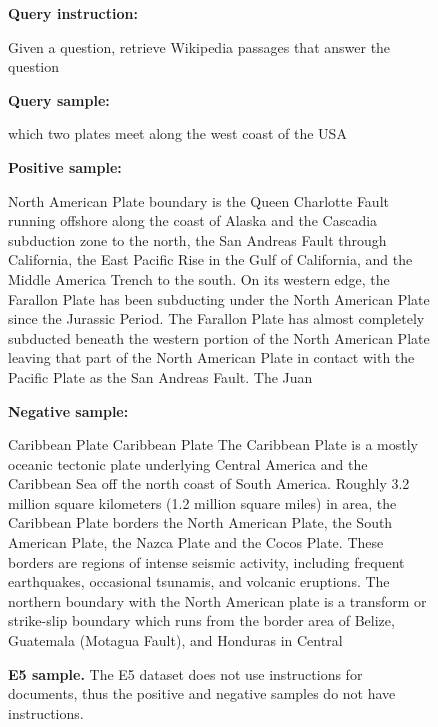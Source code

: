 \documentclass{article}
\begin{document}
\begin{figure}[htbp]
\hrulefill

\textbf{Query instruction:}

\hrulefill

Given a question, retrieve Wikipedia passages that answer the question

\hrulefill

\textbf{Query sample:}

\hrulefill

which two plates meet along the west coast of the USA

\hrulefill

\textbf{Positive sample:}

\hrulefill

North American Plate boundary is the Queen Charlotte Fault running offshore along the coast of Alaska and the Cascadia subduction zone to the north, the San Andreas Fault through California, the East Pacific Rise in the Gulf of California, and the Middle America Trench to the south. On its western edge, the Farallon Plate has been subducting under the North American Plate since the Jurassic Period. The Farallon Plate has almost completely subducted beneath the western portion of the North American Plate leaving that part of the North American Plate in contact with the Pacific Plate as the San Andreas Fault. The Juan

\hrulefill

\textbf{Negative sample:}

\hrulefill

Caribbean Plate Caribbean Plate The Caribbean Plate is a mostly oceanic tectonic plate underlying Central America and the Caribbean Sea off the north coast of South America. Roughly 3.2 million square kilometers (1.2 million square miles) in area, the Caribbean Plate borders the North American Plate, the South American Plate, the Nazca Plate and the Cocos Plate. These borders are regions of intense seismic activity, including frequent earthquakes, occasional tsunamis, and volcanic eruptions. The northern boundary with the North American plate is a transform or strike-slip boundary which runs from the border area of Belize, Guatemala (Motagua Fault), and Honduras in Central

\hrulefill

\caption{\textbf{E5 sample.} The E5 dataset does not use instructions for documents, thus the positive and negative samples do not have instructions.}
\label{fig:e5}
\end{figure}
\end{document}
